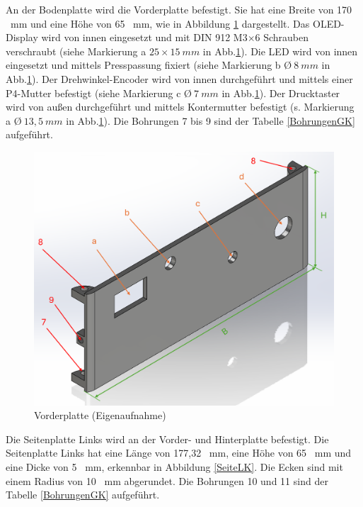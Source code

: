 An der Bodenplatte wird die Vorderplatte befestigt. Sie hat eine Breite von 170 \ mm und eine Höhe von 65 \ mm, wie in Abbildung \ref{VorneK} dargestellt. Das OLED-Display wird von innen eingesetzt und mit DIN 912 M3$\times$6 Schrauben verschraubt (siehe Markierung a $25 \times 15 \ mm$  in Abb.\ref{VorneK}). Die LED wird von innen eingesetzt und mittels Presspassung fixiert (siehe Markierung b \O $ \ 8 \ mm$ in Abb.\ref{VorneK}). Der Drehwinkel-Encoder wird von innen durchgeführt und mittels einer P4-Mutter befestigt (siehe Markierung c \O $ \ 7 \ mm$  in Abb.\ref{VorneK}). Der Drucktaster wird von außen durchgeführt und mittels Kontermutter befestigt (s. Markierung a \O $ \ 13,5 \ mm$  in Abb.\ref{VorneK}). Die Bohrungen 7 bis 9 sind der Tabelle \ref{BohrungenGK} aufgeführt.  


	\begin{figure}[H]
		\begin{center}
			\includegraphics[width=\textwidth]{Images/Konstruktion/VorneK.png}
			\caption{Vorderplatte (Eigenaufnahme)} \label{VorneK}
		\end{center}
	\end{figure}

Die Seitenplatte Links wird an der Vorder- und Hinterplatte befestigt. Die Seitenplatte Links hat eine Länge von 177,32 \ mm, eine Höhe von 65 \ mm und eine Dicke von 5 \ mm, erkennbar in Abbildung \ref{SeiteLK}. Die Ecken sind mit einem Radius von 10 \ mm abgerundet. Die Bohrungen 10 und 11 sind der Tabelle \ref{BohrungenGK} aufgeführt. 


